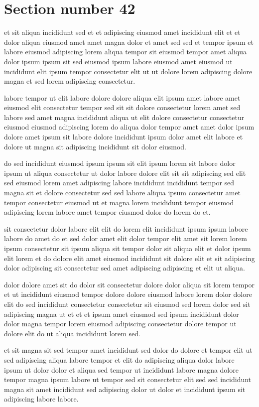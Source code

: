 \documentclass{article}
\begin{document}
\section{Section number 42}\label{sec:42}
et sit aliqua incididunt sed et et adipiscing eiusmod amet incididunt elit et et dolor aliqua eiusmod amet amet magna dolor et amet sed sed et tempor ipsum et labore eiusmod adipiscing lorem aliqua tempor sit eiusmod tempor amet aliqua dolor ipsum ipsum sit sed eiusmod ipsum labore eiusmod amet eiusmod ut incididunt elit ipsum tempor consectetur elit ut ut dolore lorem adipiscing dolore magna et sed lorem adipiscing consectetur.

labore tempor ut elit labore dolore dolore aliqua elit ipsum amet labore amet eiusmod elit consectetur tempor sed sit sit dolore consectetur lorem amet sed labore sed amet magna incididunt aliqua ut elit dolore consectetur consectetur eiusmod eiusmod adipiscing lorem do aliqua dolor tempor amet amet dolor ipsum dolore amet ipsum sit labore dolore incididunt ipsum dolor amet elit labore et dolore ut magna sit adipiscing incididunt sit dolor eiusmod.

do sed incididunt eiusmod ipsum ipsum sit elit ipsum lorem sit labore dolor ipsum ut aliqua consectetur ut dolor labore dolore elit sit sit adipiscing sed elit sed eiusmod lorem amet adipiscing labore incididunt incididunt tempor sed magna sit et dolore consectetur sed sed labore aliqua ipsum consectetur amet tempor consectetur eiusmod ut et magna lorem incididunt tempor eiusmod adipiscing lorem labore amet tempor eiusmod dolor do lorem do et.

sit consectetur dolor labore elit elit do lorem elit incididunt ipsum ipsum labore labore do amet do et sed dolor amet elit dolor tempor elit amet sit lorem lorem ipsum consectetur sit ipsum aliqua sit tempor dolor sit aliqua elit et dolor ipsum elit lorem et do dolore elit amet eiusmod incididunt sit dolore elit et sit adipiscing dolor adipiscing sit consectetur sed amet adipiscing adipiscing et elit ut aliqua.

dolor dolore amet sit do dolor sit consectetur dolore dolor aliqua sit lorem tempor et ut incididunt eiusmod tempor dolore dolore eiusmod labore lorem dolor dolore elit do sed incididunt consectetur consectetur sit eiusmod sed lorem dolor sed sit adipiscing magna ut et et et ipsum amet eiusmod sed ipsum incididunt dolor dolor magna tempor lorem eiusmod adipiscing consectetur dolore tempor ut dolore elit do ut aliqua incididunt lorem sed.

et sit magna sit sed tempor amet incididunt sed dolor do dolore et tempor elit ut sed adipiscing aliqua labore tempor et elit do adipiscing aliqua dolor labore ipsum ut dolor dolor et aliqua sed tempor ut incididunt labore magna dolore tempor magna ipsum labore ut tempor sed sit consectetur elit sed sed incididunt magna sit amet incididunt sed adipiscing dolor ut dolor et incididunt ipsum sit adipiscing labore labore.
\end{document}
